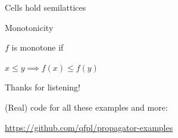\documentclass[UKenglish,usenames,dvipsnames,svgnames,table,aspectratio=169,mathserif]{beamer}
\newcommand{\nl}{\vspace{\baselineskip}}
\begin{document}
\begin{frame}
Cells hold semilattices
\end{frame}


\begin{frame}

\centering \huge
Monotonicity
\nl

\Large
$f$ is monotone if\\
\nl

$ x \leq y \implies f(x) \leq f(y)$

\end{frame}


\begin{frame}
\huge \centering
Thanks for listening!
\nl

\large
(Real) code for all these examples and more:

\url{https://github.com/qfpl/propagator-examples}

\end{frame}
\end{document}
